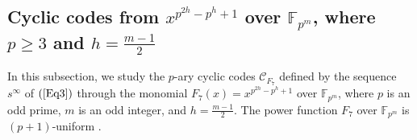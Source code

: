 \documentclass[pdflatex,sn-mathphys-num]{sn-jnl}%
\theoremstyle{thmstyleone}%
\theoremstyle{thmstyletwo}%
\theoremstyle{thmstylethree}%
\begin{document}
\subsection{Cyclic codes from $x^{p^{2h}-p^{h}+1}$ over $\mathbb{F}_{p^m}$, where $p\geq 3$ and $h=\frac{m-1}{2}$}
In this subsection, we study the $p$-ary cyclic codes $\mathcal{C}_{F_{7}}$ defined by the sequence $s^{\infty}$ of $(\ref{Eq3})$ through the monomial $F_{7}(x)=x^{p^{2h}-p^{h}+1}$ over $\mathbb{F}_{p^m}$, where $p$ is an odd prime, $m$ is an odd integer, and $h=\frac{m-1}{2}$. The power function $F_{7}$ over $\mathbb{F}_{p^m}$ is $(p+1)$-uniform \cite[Theorem $2$]{Uniform7}.  %
\end{document}
